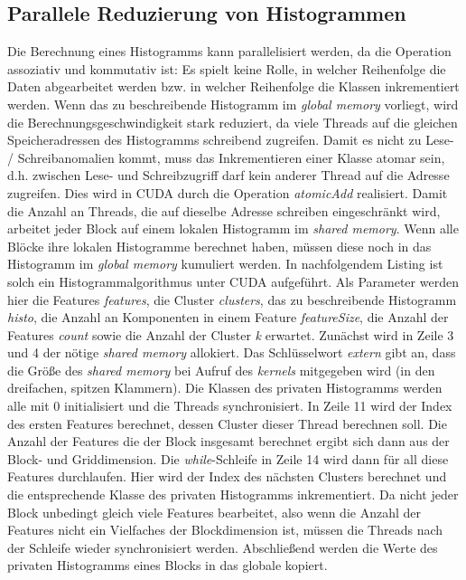 \subsection{Parallele Reduzierung von Histogrammen}

Die Berechnung eines Histogramms kann parallelisiert werden, da die Operation assoziativ und kommutativ ist: Es spielt keine Rolle, in welcher Reihenfolge die Daten abgearbeitet werden bzw. in welcher Reihenfolge die Klassen inkrementiert werden. Wenn das zu beschreibende Histogramm im \textit{global memory} vorliegt, wird die Berechnungsgeschwindigkeit stark reduziert, da viele Threads auf die gleichen Speicheradressen des Histogramms schreibend zugreifen. Damit es nicht zu Lese- / Schreibanomalien kommt, muss das Inkrementieren einer Klasse atomar sein, d.h. zwischen Lese- und Schreibzugriff darf kein anderer Thread auf die Adresse zugreifen. Dies wird in CUDA durch die Operation \textit{atomicAdd} realisiert. Damit die Anzahl an Threads, die auf dieselbe Adresse schreiben eingeschränkt wird, arbeitet jeder Block auf einem lokalen Histogramm im \textit{shared memory}. Wenn alle Blöcke ihre lokalen Histogramme berechnet haben, müssen diese noch in das Histogramm im \textit{global memory} kumuliert werden.\newline
In nachfolgendem Listing ist solch ein Histogrammalgorithmus unter CUDA aufgeführt. Als Parameter werden hier die Features \textit{features}, die Cluster \textit{clusters}, das zu beschreibende Histogramm \textit{histo}, die Anzahl an Komponenten in einem Feature \textit{featureSize}, die Anzahl der Features \textit{count} sowie die Anzahl der Cluster \textit{k} erwartet. Zunächst wird in Zeile 3 und 4 der nötige \textit{shared memory} allokiert. Das Schlüsselwort \textit{extern} gibt an, dass die Größe des \textit{shared memory} bei Aufruf des \textit{kernels} mitgegeben wird (in den dreifachen, spitzen Klammern). Die Klassen des privaten Histogramms werden alle mit 0 initialisiert und die Threads synchronisiert. In Zeile 11 wird der Index des ersten Features berechnet, dessen Cluster dieser Thread berechnen soll. Die Anzahl der Features die der Block insgesamt berechnet ergibt sich dann aus der Block- und Griddimension. Die \textit{while}-Schleife in Zeile 14 wird dann für all diese Features durchlaufen. Hier wird der Index des nächsten Clusters berechnet und die entsprechende Klasse des privaten Histogramms inkrementiert. Da nicht jeder Block unbedingt gleich viele Features bearbeitet, also wenn die Anzahl der Features nicht ein Vielfaches der Blockdimension ist, müssen die Threads nach der Schleife wieder synchronisiert werden. Abschließend werden die Werte des privaten Histogramms eines Blocks in das globale kopiert.


